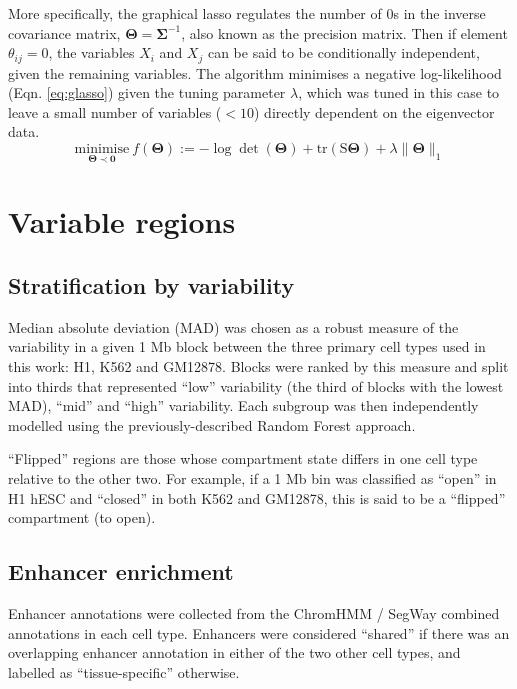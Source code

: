 \documentclass[a4paper,10pt,oneside]{book}
\begin{document}
More specifically, the graphical lasso regulates the number of 0s in
the inverse covariance matrix, $\bm{\Theta}=\bm{\Sigma}^{-1}$, also known as the
precision matrix. Then if element $\theta_{ij}=0$, the variables $X_i$ and $X_j$ can be said to be
conditionally independent, given the remaining
variables.\cite{Mazumder2012} The algorithm minimises a negative
log-likelihood (Eqn. \ref{eq:glasso}\cite{Mazumder2012}) given the tuning parameter $\lambda$, which was tuned
in this case to leave a small number of variables ($<10$)
directly dependent on the eigenvector data. \\
\begin{equation} \label{eq:glasso}
\underset{\bm{\Theta}\prec\bm{0}}{\mathrm{minimise}}~f(\bm{\Theta}) :=
-\log\det(\bm{\Theta}) + \mathrm{tr}(\bm{\mathrm{S}\Theta}) + \lambda
\lVert\bm{\Theta}\rVert_1
\end{equation}


\section{Variable regions}\label{variable-regions}

\subsection{Stratification by
variability}\label{stratification-by-variability}

Median absolute deviation (MAD) was chosen as a robust measure of the
variability in a given 1 Mb block between the three primary cell types
used in this work: H1, K562 and GM12878. Blocks were ranked by this
measure and split into thirds that represented ``low'' variability (the
third of blocks with the lowest MAD), ``mid'' and ``high'' variability.
Each subgroup was then independently modelled using the
previously-described Random Forest approach.

``Flipped'' regions are those whose compartment state differs in one
cell type relative to the other two. For example, if a 1 Mb bin was
classified as ``open'' in H1 hESC and ``closed'' in both K562 and
GM12878, this is said to be a ``flipped'' compartment (to open).

\subsection{Enhancer enrichment}\label{enhancer-enrichment}

Enhancer annotations were collected from the ChromHMM / SegWay combined
annotations in each cell type.\citep{Hoffman2013} Enhancers were
considered ``shared'' if there was an overlapping enhancer annotation in
either of the two other cell types, and labelled as ``tissue-specific''
otherwise.
\end{document}
